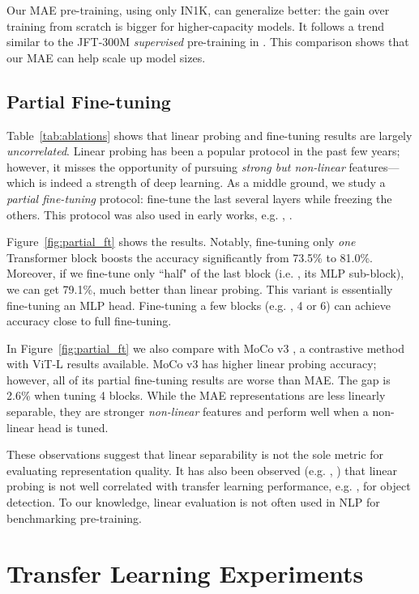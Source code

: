 Our MAE pre-training, using only IN1K, can generalize better: the gain over training from scratch is bigger for higher-capacity models. It follows a trend similar to the \mbox{JFT-300M} \textit{supervised} pre-training in \cite{Dosovitskiy2021}. This comparison shows that our MAE can help scale up model sizes.

\subsection{Partial Fine-tuning}
\label{sec:partial_ft}

Table~\ref{tab:ablations} shows that linear probing and fine-tuning results are largely \textit{uncorrelated}. Linear probing has been a popular protocol in the past few years; however, it misses the opportunity of pursuing \textit{strong but non-linear} features---which is indeed a strength of deep learning. As a middle ground, we study a \textit{partial fine-tuning} protocol: fine-tune the last several layers while freezing the others. This protocol was also used in early works, e.g. , \cite{Yosinski2014,Zhang2016,Noroozi2016}.

Figure~\ref{fig:partial_ft} shows the results. Notably, fine-tuning only \textit{one} Transformer block boosts the accuracy significantly from 73.5\% to 81.0\%. Moreover, if we fine-tune only ``half" of the last block (i.e. , its MLP sub-block), we can get 79.1\%, much better than linear probing. This variant is essentially fine-tuning an MLP head. Fine-tuning a few blocks (e.g. , 4 or 6) can achieve accuracy close to full fine-tuning.

In Figure~\ref{fig:partial_ft} we also compare with MoCo v3 \cite{Chen2021a}, a contrastive method with ViT-L results available. MoCo v3 has higher linear probing accuracy; however, all of its partial fine-tuning results are worse than MAE. The gap is 2.6\% when tuning 4 blocks. While the MAE representations are less linearly separable, they are stronger \textit{non-linear} features and perform well when a non-linear head is tuned.

These observations suggest that linear separability is not the sole metric for evaluating representation quality. It has also been observed (e.g. , \cite{Chen2021}) that linear probing is not well \mbox{correlated} with transfer learning performance, e.g. , for object detection. To our knowledge, linear evaluation is not often used in NLP for benchmarking pre-training.

\section{Transfer Learning Experiments}\label{sec:transfer}

